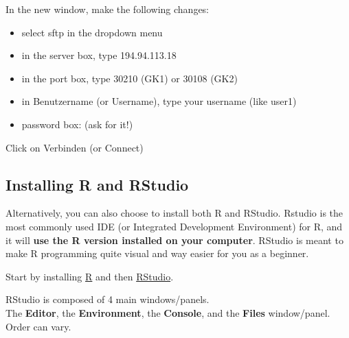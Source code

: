 \documentclass[
]{book}
\providecommand{\tightlist}{%
  \setlength{\itemsep}{0pt}\setlength{\parskip}{0pt}}
\begin{document}
In the new window, make the following changes:

\begin{itemize}
\tightlist
\item
  select sftp in the dropdown menu
\item
  in the server box, type 194.94.113.18
\item
  in the port box, type 30210 (GK1) or 30108 (GK2)
\item
  in Benutzername (or Username), type your username (like user1)
\item
  password box: (ask for it!)
\end{itemize}

Click on Verbinden (or Connect)

\hypertarget{installing-r-and-rstudio}{%
\subsection*{Installing R and RStudio}\label{installing-r-and-rstudio}}

Alternatively, you can also choose to install both R and RStudio.
Rstudio is the most commonly used IDE (or Integrated Development Environment) for R, and it will \textbf{use the R version installed on your computer}.
RStudio is meant to make R programming quite visual and way easier for you as a beginner.

Start by installing \href{https://cran.r-project.org/}{R} and then \href{https://posit.co/download/rstudio-desktop/}{RStudio}.

RStudio is composed of 4 main windows/panels.\\
The \textbf{Editor}, the \textbf{Environment}, the \textbf{Console}, and the \textbf{Files} window/panel.
Order can vary.
\end{document}
